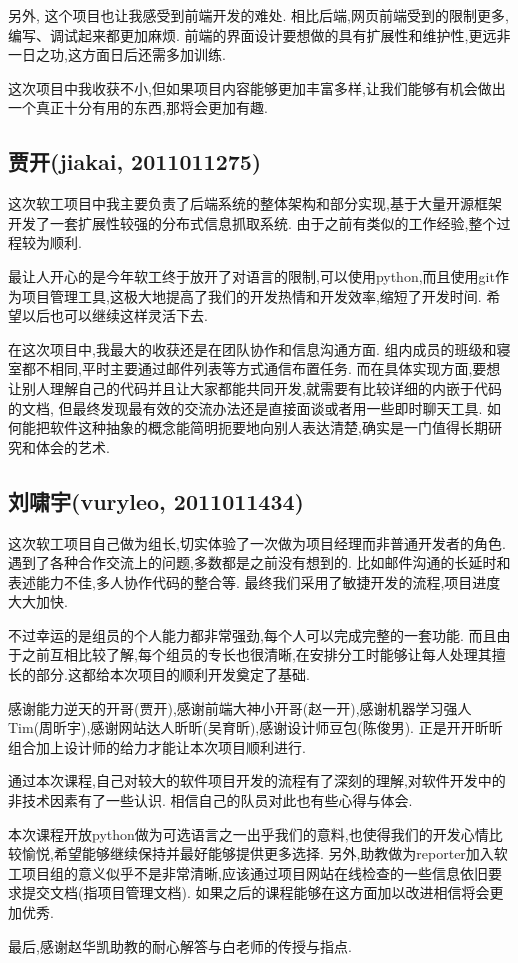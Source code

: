   另外, 这个项目也让我感受到前端开发的难处.
  相比后端,网页前端受到的限制更多,编写、调试起来都更加麻烦.
  前端的界面设计要想做的具有扩展性和维护性,更远非一日之功,这方面日后还需多加训练.

  这次项目中我收获不小,但如果项目内容能够更加丰富多样,让我们能够有机会做出一个真正十分有用的东西,那将会更加有趣.

\subsection{贾开(jiakai, 2011011275)}
  这次软工项目中我主要负责了后端系统的整体架构和部分实现,基于大量开源框架开发了一套扩展性较强的分布式信息抓取系统.
  由于之前有类似的工作经验,整个过程较为顺利.

  最让人开心的是今年软工终于放开了对语言的限制,可以使用python,而且使用git作为项目管理工具,这极大地提高了我们的开发热情和开发效率,缩短了开发时间.
  希望以后也可以继续这样灵活下去.

  在这次项目中,我最大的收获还是在团队协作和信息沟通方面.
  组内成员的班级和寝室都不相同,平时主要通过邮件列表等方式通信布置任务.
  而在具体实现方面,要想让别人理解自己的代码并且让大家都能共同开发,就需要有比较详细的内嵌于代码的文档,
  但最终发现最有效的交流办法还是直接面谈或者用一些即时聊天工具.
  如何能把软件这种抽象的概念能简明扼要地向别人表达清楚,确实是一门值得长期研究和体会的艺术.

\subsection{刘啸宇(vuryleo, 2011011434)}
  这次软工项目自己做为组长,切实体验了一次做为项目经理而非普通开发者的角色.遇到了各种合作交流上的问题,多数都是之前没有想到的.
  比如邮件沟通的长延时和表述能力不佳,多人协作代码的整合等.
  最终我们采用了敏捷开发的流程,项目进度大大加快.

  不过幸运的是组员的个人能力都非常强劲,每个人可以完成完整的一套功能.
  而且由于之前互相比较了解,每个组员的专长也很清晰,在安排分工时能够让每人处理其擅长的部分.这都给本次项目的顺利开发奠定了基础.

  感谢能力逆天的开哥(贾开),感谢前端大神小开哥(赵一开),感谢机器学习强人Tim(周昕宇),感谢网站达人昕昕(吴育昕),感谢设计师豆包(陈俊男).
  正是开开昕昕组合加上设计师的给力才能让本次项目顺利进行.

  通过本次课程,自己对较大的软件项目开发的流程有了深刻的理解,对软件开发中的非技术因素有了一些认识.
  相信自己的队员对此也有些心得与体会.

  本次课程开放python做为可选语言之一出乎我们的意料,也使得我们的开发心情比较愉悦,希望能够继续保持并最好能够提供更多选择.
  另外,助教做为reporter加入软工项目组的意义似乎不是非常清晰,应该通过项目网站在线检查的一些信息依旧要求提交文档(指项目管理文档).
  如果之后的课程能够在这方面加以改进相信将会更加优秀.

  最后,感谢赵华凯助教的耐心解答与白老师的传授与指点.

